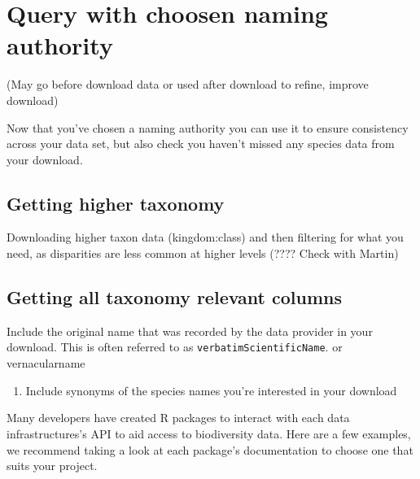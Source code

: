 \documentclass[
  letterpaper,
  DIV=11,
  numbers=noendperiod,
  oneside]{scrreprt}
\providecommand{\tightlist}{%
  \setlength{\itemsep}{0pt}\setlength{\parskip}{0pt}}\usepackage{longtable,booktabs,array}
\begin{document}
\hypertarget{query-with-choosen-naming-authority}{%
\section{Query with choosen naming
authority}\label{query-with-choosen-naming-authority}}

(May go before download data or used after download to refine, improve
download)

Now that you've chosen a naming authority you can use it to ensure
consistency across your data set, but also check you haven't missed any
species data from your download.

\hypertarget{getting-higher-taxonomy}{%
\subsection{Getting higher taxonomy}\label{getting-higher-taxonomy}}

Downloading higher taxon data (kingdom:class) and then filtering for
what you need, as disparities are less common at higher levels (????
Check with Martin)

\hypertarget{getting-all-taxonomy-relevant-columns}{%
\subsection{Getting all taxonomy relevant
columns}\label{getting-all-taxonomy-relevant-columns}}

Include the original name that was recorded by the data provider in your
download. This is often referred to as \texttt{verbatimScientificName}.
or vernacularname

\begin{enumerate}
\def\labelenumi{\arabic{enumi}.}
\setcounter{enumi}{1}
\tightlist
\item
  Include synonyms of the species names you're interested in your
  download
\end{enumerate}

Many developers have created R packages to interact with each data
infrastructures's API to aid access to biodiversity data. Here are a few
examples, we recommend taking a look at each package's documentation to
choose one that suits your project.
\end{document}

